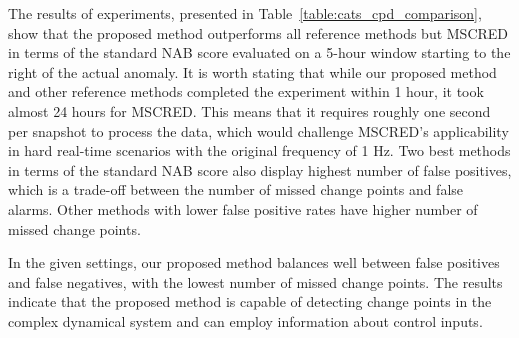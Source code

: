 The results of experiments, presented in Table~\ref{table:cats_cpd_comparison}, show that the proposed method outperforms all reference methods but MSCRED in terms of the standard NAB score evaluated on a 5-hour window starting to the right of the actual anomaly. It is worth stating that while our proposed method and other reference methods completed the experiment within 1 hour, it took almost 24 hours for MSCRED. This means that it requires roughly one second per snapshot to process the data, which would challenge MSCRED's applicability in hard real-time scenarios with the original frequency of 1 Hz. Two best methods in terms of the standard NAB score also display highest number of false positives, which is a trade-off between the number of missed change points and false alarms. Other methods with lower false positive rates have higher number of missed change points.

In the given settings, our proposed method balances well between false positives and false negatives, with the lowest number of missed change points. The results indicate that the proposed method is capable of detecting change points in the complex dynamical system and can employ information about control inputs.

